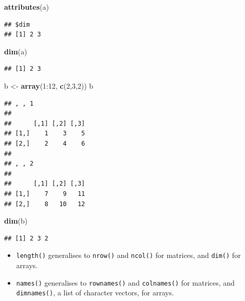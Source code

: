 \documentclass[]{book}
\newenvironment{Shaded}{\begin{snugshade}}{\end{snugshade}}
\newcommand{\KeywordTok}[1]{\textcolor[rgb]{0.13,0.29,0.53}{\textbf{{#1}}}}
\newcommand{\DecValTok}[1]{\textcolor[rgb]{0.00,0.00,0.81}{{#1}}}
\newcommand{\StringTok}[1]{\textcolor[rgb]{0.31,0.60,0.02}{{#1}}}
\newcommand{\NormalTok}[1]{{#1}}
\providecommand{\tightlist}{%
  \setlength{\itemsep}{0pt}\setlength{\parskip}{0pt}}
\begin{document}
\begin{Shaded}
\begin{Highlighting}[]
\KeywordTok{attributes}\NormalTok{(a)}
\end{Highlighting}
\end{Shaded}

\begin{verbatim}
## $dim
## [1] 2 3
\end{verbatim}

\begin{Shaded}
\begin{Highlighting}[]
\KeywordTok{dim}\NormalTok{(a)}
\end{Highlighting}
\end{Shaded}

\begin{verbatim}
## [1] 2 3
\end{verbatim}

\begin{Shaded}
\begin{Highlighting}[]
\NormalTok{b <-}\StringTok{ }\KeywordTok{array}\NormalTok{(}\DecValTok{1}\NormalTok{:}\DecValTok{12}\NormalTok{, }\KeywordTok{c}\NormalTok{(}\DecValTok{2}\NormalTok{,}\DecValTok{3}\NormalTok{,}\DecValTok{2}\NormalTok{))}
\NormalTok{b}
\end{Highlighting}
\end{Shaded}

\begin{verbatim}
## , , 1
## 
##      [,1] [,2] [,3]
## [1,]    1    3    5
## [2,]    2    4    6
## 
## , , 2
## 
##      [,1] [,2] [,3]
## [1,]    7    9   11
## [2,]    8   10   12
\end{verbatim}

\begin{Shaded}
\begin{Highlighting}[]
\KeywordTok{dim}\NormalTok{(b)}
\end{Highlighting}
\end{Shaded}

\begin{verbatim}
## [1] 2 3 2
\end{verbatim}

\begin{itemize}
\tightlist
\item
  \texttt{length()} generalises to \texttt{nrow()} and \texttt{ncol()}
  for matrices, and \texttt{dim()} for arrays.
\item
  \texttt{names()} generalises to \texttt{rownames()} and
  \texttt{colnames()} for matrices, and \texttt{dimnames()}, a list of
  character vectors, for arrays.
\end{itemize}
\end{document}
